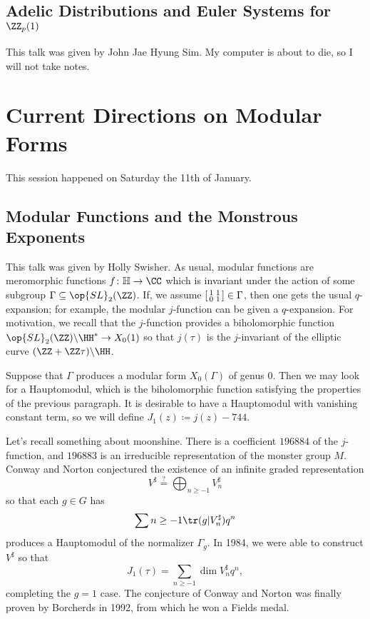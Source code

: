 \documentclass{article}
\begin{document}
\subsection{Adelic Distributions and Euler Systems for \texorpdfstring{$\ZZ_p(1)$}{Zp(1)}}
This talk was given by John Jae Hyung Sim. My computer is about to die, so I will not take notes.

\section{Current Directions on Modular Forms}
This session happened on Saturday the 11th of January.

\subsection{Modular Functions and the Monstrous Exponents}
This talk was given by Holly Swisher. As usual, modular functions are meromorphic functions $f\colon\mathbb H\to\CC$ which is invariant under the action of some subgroup $\Gamma\subseteq\op{SL}_2(\ZZ)$. If, we assume $\begin{bsmallmatrix}
	1 & 1 \\ 0 & 1
\end{bsmallmatrix}\in\Gamma$, then one gets the usual $q$-expansion; for example, the modular $j$-function can be given a $q$-expansion. For motivation, we recall that the $j$-function provides a biholomorphic function $\op{SL}_2(\ZZ)\backslash\HH^*\to X_0(1)$ so that $j(\tau)$ is the $j$-invariant of the elliptic curve $(\ZZ+\ZZ\tau)\backslash\HH$.

Suppose that $\Gamma$ produces a modular form $X_0(\Gamma)$ of genus $0$. Then we may look for a Hauptomodul, which is the biholomorphic function satisfying the properties of the previous paragraph. It is desirable to have a Hauptomodul with vanishing constant term, so we will define $J_1(z)\coloneqq j(z)-744$.

Let's recall something about moonshine. There is a coefficient $196884$ of the $j$-function, and $196883$ is an irreducible representation of the monster group $M$. Conway and Norton conjectured the existence of an infinite graded representation
\[V^\sharp\stackrel?=\bigoplus_{n\ge-1}V_n^\sharp\]
so that each $g\in G$ has
\[\sum{n\ge-1}\tr(g|V_n^\sharp)q^n\]
produces a Hauptomodul of the normalizer $\Gamma_g$. In 1984, we were able to construct $V^\sharp$ so that
\[J_1(\tau)=\sum_{n\ge-1}\dim V_n^\sharp q^n,\]
completing the $g=1$ case. The conjecture of Conway and Norton was finally proven by Borcherds in 1992, from which he won a Fields medal.
\end{document}
